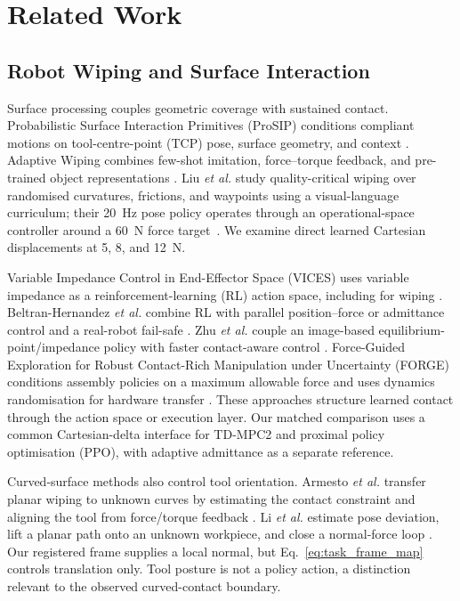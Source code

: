 \section{Related Work}
\label{sec:related_work}

\subsection{Robot Wiping and Surface Interaction}

Surface processing couples geometric coverage with sustained contact.
Probabilistic Surface Interaction Primitives (ProSIP) conditions compliant
motions on tool-centre-point (TCP) pose, surface geometry, and context
\cite{unger2024prosip}. Adaptive Wiping combines few-shot imitation,
force--torque feedback, and pre-trained object representations
\cite{tsuji2025adaptivewiping}. Liu \emph{et al.} study quality-critical wiping
over randomised curvatures, frictions, and waypoints using a visual-language
curriculum; their 20~Hz pose policy operates through an operational-space
controller around a 60~N force target~\cite{liu2025wipingvlm}. We examine direct
learned Cartesian displacements at 5, 8, and 12~N.

Variable Impedance Control in End-Effector Space (VICES) uses variable
impedance as a reinforcement-learning (RL) action space, including for wiping
\cite{martinmartin2019vices}. Beltran-Hernandez \emph{et al.} combine RL with
parallel position--force or admittance control and a real-robot fail-safe
\cite{beltranhernandez2020force}. Zhu \emph{et al.} couple an image-based
equilibrium-point/impedance policy with faster contact-aware control
\cite{zhu2022contactsafe}. Force-Guided Exploration for Robust Contact-Rich
Manipulation under Uncertainty (FORGE) conditions assembly policies on a
maximum allowable force and uses dynamics randomisation for hardware transfer
\cite{noseworthy2025forge}. These approaches structure learned contact through
the action space or execution layer. Our matched comparison uses a common
Cartesian-delta interface for TD-MPC2 and proximal policy optimisation (PPO),
with adaptive admittance as a separate reference.

Curved-surface methods also control tool orientation. Armesto \emph{et al.}
transfer planar wiping to unknown curves by estimating the contact constraint
and aligning the tool from force/torque feedback
\cite{armesto2018constraintaware}. Li \emph{et al.} estimate pose deviation,
lift a planar path onto an unknown workpiece, and close a normal-force loop
\cite{li2023unknownsurface}. Our registered frame supplies a local normal, but
Eq.~\eqref{eq:task_frame_map} controls translation only. Tool posture is not a
policy action, a distinction relevant to the observed curved-contact boundary.

